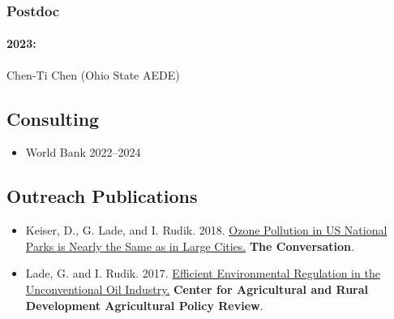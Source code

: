 \documentclass[11pt]{res} %
\begin{document}
\begin{resume}
\vspace{-.2in}

\subsubsection{Postdoc}\vspace{-.2in}
\paragraph{2023:} Chen-Ti Chen (Ohio State AEDE)

\vspace{-.2in}




\subsection{Consulting}

\begin{itemize} %
	\item[] World Bank \hfill 2022--2024
\end{itemize}

\vspace{-.2in}

\subsection{Outreach Publications}

\begin{itemize} %
	\item[] Keiser, D., G. Lade, and I. Rudik. 2018. \href{https://theconversation.com/ozone-pollution-in-us-national-parks-is-nearly-the-same-as-in-large-cities-100148}{Ozone Pollution in US National Parks is Nearly the Same as in Large Cities.} \textbf{The Conversation}.
	\item[] Lade, G. and I. Rudik. 2017. \href{https://www.card.iastate.edu/ag_policy_review/display.aspx?id=70}{Efficient Environmental Regulation in the Unconventional Oil Industry.} \textbf{Center for Agricultural and Rural Development Agricultural Policy Review}.
\end{itemize}


\end{resume}
\end{document}
